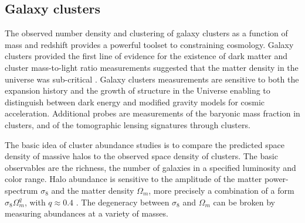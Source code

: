 \subsection{Galaxy clusters}
The observed number density and clustering of galaxy clusters as a function of mass and redshift provides a powerful toolset to constraining cosmology.  Galaxy clusters provided the first line of evidence for the existence of dark matter \textcite{zwicky} and cluster mass-to-light ratio measurements suggested that the matter density in the universe was sub-critical \textcite{Gott}. Galaxy clusters measurements are sensitive to both the expansion history and the growth of structure in the Universe enabling to distinguish between dark energy and modified gravity models for cosmic acceleration. Additional probes are measurements of the baryonic mass fraction in clusters, and of the tomographic lensing signatures through clusters.

The basic idea of cluster abundance studies is to compare the predicted space density of massive halos to the observed space density of clusters. The basic observables are the richness, the number of galaxies in a specified luminosity and color range. Halo abundance is sensitive to the amplitude of the matter power-spectrum $\sigma_8$ and the matter density $\Omega_m$, more precisely a combination of a form $\sigma_8\Omega_m^q$, with $q\approx0.4$ \textcite{white}. The degeneracy between $\sigma_8$ and $\Omega_m$ can be broken by measuring abundances at a variety of masses.
